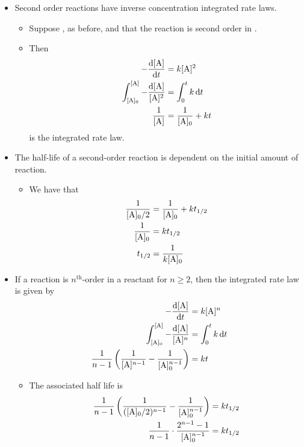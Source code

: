 \documentclass[../notes.tex]{subfiles}
\begin{document}
\begin{itemize}
\begin{itemize}
    \end{itemize}
    \item Second order reactions have inverse concentration integrated rate laws.
    \begin{itemize}
        \item Suppose , as before, and that the reaction is second order in .
        \item Then
        \begin{align*}
            -\dv{[\ce{A}]}{t} &= k[\ce{A}]^2\\
            \int_{[\ce{A}]_0}^{[\ce{A}]}-\frac{\dd{[\ce{A}]}}{[\ce{A}]^2} &= \int_0^tk\dd{t}\\
            \frac{1}{[\ce{A}]} &= \frac{1}{[\ce{A}]_0}+kt
        \end{align*}
        is the integrated rate law.
    \end{itemize}
    \item The half-life of a second-order reaction is dependent on the initial amount of reaction.
    \begin{itemize}
        \item We have that
        \begin{align*}
            \frac{1}{[\ce{A}]_0/2} &= \frac{1}{[\ce{A}]_0}+kt_{1/2}\\
            \frac{1}{[\ce{A}]_0} &= kt_{1/2}\\
            t_{1/2} &= \frac{1}{k[\ce{A}]_0}
        \end{align*}
    \end{itemize}
    \item If a reaction is $n^\text{th}$-order in a reactant for $n\geq 2$, then the integrated rate law is given by
    \begin{align*}
        -\dv{[\ce{A}]}{t} &= k[\ce{A}]^n\\
        \int_{[\ce{A}]_0}^{[\ce{A}]}-\frac{\dd{[\ce{A}]}}{[\ce{A}]^n} &= \int_0^tk\dd{t}\\
        \frac{1}{n-1}\left( \frac{1}{[\ce{A}]^{n-1}}-\frac{1}{[\ce{A}]_0^{n-1}} \right) &= kt
    \end{align*}
    \begin{itemize}
        \item The associated half life is
        \begin{align*}
            \frac{1}{n-1}\left( \frac{1}{([\ce{A}]_0/2)^{n-1}}-\frac{1}{[\ce{A}]_0^{n-1}} \right) &= kt_{1/2}\\
            \frac{1}{n-1}\cdot\frac{2^{n-1}-1}{[\ce{A}]_0^{n-1}} &= kt_{1/2}\\

\end{align*}
\end{itemize}
\end{itemize}
\end{document}
